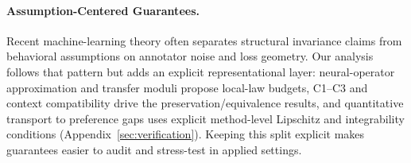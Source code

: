 \paragraph{Assumption-Centered Guarantees.}
Recent machine-learning theory often separates structural invariance
claims from behavioral assumptions on annotator noise and loss geometry.
Our analysis follows that pattern but adds an explicit representational
layer: neural-operator approximation and transfer moduli propose
local-law budgets, C1--C3 and context compatibility drive the
preservation/equivalence results, and quantitative transport to
preference gaps uses explicit method-level Lipschitz and integrability
conditions (Appendix~\ref{sec:verification}). Keeping this split explicit
makes guarantees easier to audit and stress-test in applied settings.
